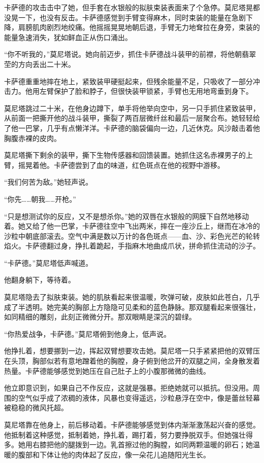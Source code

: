 \documentclass[AutoFakeBold=true]{book}
\begin{document}
卡萨德的攻击击中了她，但手套在水银般的拟肤束装表面来了个急停。莫尼塔晃都没晃一下，也没有反击。卡萨德感觉到手臂变得麻木，同时束装的能量在急剧下降，肩膀肌肉剧烈地绞痛。他摇摇晃晃地朝后退，手臂无力地耷拉在身旁，束装的能量急速消失，犹如鲜血正从伤口涌出。

``你不听我的，''莫尼塔说。她向前迈步，抓住卡萨德战斗装甲的前襟，将他朝翡翠茔的方向丢出二十米。

卡萨德重重地摔在地上，紧致装甲硬挺起来，但残余能量不足，只吸收了一部分冲击力。他用左臂保护了脸和脖子，但很快装甲锁紧，手臂也无用地弯垂到身下。

莫尼塔跳过二十米，在他身边蹲下，单手将他举向空中，另一只手抓住紧致装甲，从前面一把撕开他的战斗装甲，撕裂了两百层微纤丝和最后一层聚合布。她轻轻给了他一巴掌，几乎有点懒洋洋。卡萨德的脑袋偏向一边，几近休克。风沙敲击着他胸腹赤裸的皮肉。

莫尼塔撕下剩余的装甲，撕下生物传感器和回馈装置。她抓住这名赤裸男子的上臂，摇晃着他。卡萨德尝到了血的味道，红色斑点在他的视野中游移。

``我们何苦为敌。''她轻声说。

``你先……朝我……开枪。''

``只是想测试你的反应，又不是想杀你。''她的双唇在水银般的网膜下自然地移动着。她又给了他一巴掌，卡萨德往空中飞出两米，摔在一座沙丘上，继而在冰冷的沙粒中朝底部滚去。空气中满是数以万计的各色斑点——血、沙、彩色光芒的轮转焰火。卡萨德翻过身，挣扎着跪起，手指麻木地曲成爪状，拼命抓住流动的沙子。

``卡萨德。''莫尼塔低声喊道。

他翻身躺下，等待着。

莫尼塔隐去了拟肤束装。她的肌肤看起来很温暖，吹弹可破，皮肤如此苍白，几乎成了半透明。她完美的胸部上方隐隐可见柔和的蓝色静脉。那双腿看起来很强壮，如同精细的雕刻，此刻正微微分开。那双眼睛是深沉的碧绿。

``你热爱战争，卡萨德。''莫尼塔俯到他身上，低声说。

他挣扎着，想要挪到一边，挥起双臂想要攻击她。莫尼塔一只手紧紧把他的双臂压在头顶，胸部似若有意地蹭着他的胸膛，身子俯到他岔开的双腿之间，全身散发着热量。卡萨德能够感觉到她压在自己肚子上的小腹那微微的曲线。

他立即意识到，如果自己不作反应，这就是强暴。拒绝她就可以抵抗。但没用。周围的空气似乎成了浓稠的液体，风暴也变得遥远，沙粒悬浮在空中，像是蕾丝轻幕被稳稳的微风托超。

莫尼塔靠在他身上，前后移动着。卡萨德能够感觉到体内渐渐激荡起兴奋的感觉。他抵制着这种感觉，抵制着她，挣扎着，踢打着，努力要挣脱双手。但她强壮得多。她用右膝把他的腿拨到一边。乳首擦过他的胸膛，如同两颗温暖的卵石；她温暖的腹部和下体让他的肉体起了反应，像一朵花儿追随阳光生长。
\end{document}
